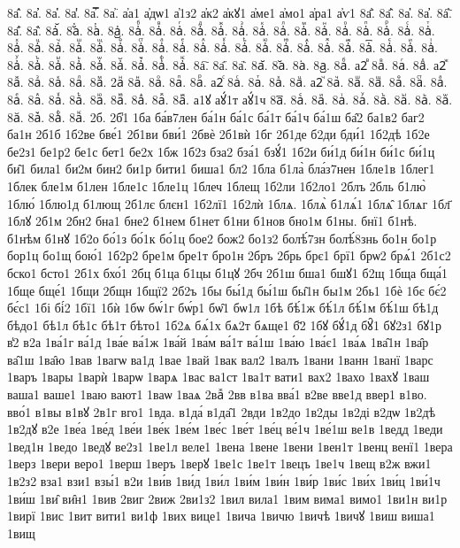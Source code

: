 {8а҆̑.
8а҆̓.
8а҆̔.
8а҆̾.
8а҆̿.
8а҆͘.
а҆а1
а҆дѡ1
а҆1з2
а҆к2
а҆кꙋ1
а҆ме1
а҆мо1
а҆ра1
а҆ѵ1
8а҆҃.
8а҆҄.
8а҆҅.
8а҆҆.
8а҆҇.
8а҆᷀.
8а҆᷁.
8а҆᷶.
8а᷷҆.
8а᷸҆.
8а᷹҆.
8а҆ⷠ.
8а҆ⷡ.
8а҆ⷢ.
8а҆ⷣ.
8а҆ⷤ.
8а҆ⷥ.
8а҆ⷦ.
8а҆ⷧ.
8а҆ⷨ.
8а҆ⷩ.
8а҆ⷪ.
8а҆ⷫ.
8а҆ⷬ.
8а҆ⷭ.
8а҆ⷮ.
8а҆ⷯ.
8а҆ⷰ.
8а҆ⷱ.
8а҆ⷲ.
8а҆ⷳ.
8а҆ⷴ.
8а҆ⷵ.
8а҆ⷶ.
8а҆ⷷ.
8а҆ⷸ.
8а҆ⷹ.
8а҆ⷺ.
8а҆ⷻ.
8а҆ⷼ.
8а҆ⷽ.
8а҆ⷾ.
8а҆ⷿ.
8а҆꙯.
8а҆ꙴ.
8а҆ꙵ.
8а҆ꙶ.
8а҆ꙷ.
8а҆ꙸ.
8а҆ꙹ.
8а҆ꙺ.
8а҆ꙻ.
8а҆꙼.
8а҆꙽.
8а҆ꚞ.
8а҆ꚟ.
8а҇.
8а᷀.
8а᷁.
8а᷶.
8а᷷.
8а᷸.
8а᷹.
8аⷠ.
а2ⷡ
8аⷡ.
8аⷢ.
8аⷣ.
а2ⷤ
8аⷤ.
8аⷥ.
8аⷦ.
8аⷧ.
8аⷨ.
2аⷩ
8аⷩ.
8аⷪ.
8аⷫ.
8аⷬ.
а2ⷭ
8аⷭ.
8аⷮ.
8аⷯ.
8аⷰ.
а2ⷱ
8аⷱ.
8аⷲ.
8аⷳ.
8аⷴ.
8аⷵ.
8аⷶ.
8аⷷ.
8аⷸ.
8аⷹ.
8аⷺ.
8аⷻ.
8аⷼ.
8аⷽ.
8аⷾ.
8аⷿ.
а1ꙋ
аꙋ́1т
аꙋ́1ч
8а꙯.
8аꙴ.
8аꙵ.
8аꙶ.
8аꙷ.
8аꙸ.
8аꙹ.
8аꙺ.
8аꙻ.
8а꙼.
8а꙽.
8аꚞ.
8аꚟ.
2б.
2б̾1
1ба
ба́в7лен
ба́1н
ба́1с
ба́1т
ба́1ч
ба́1ш
ба̑2
ба1в2
баг2
ба1н
2б1б
1б2ве
бве́1
2б1ви
бви́1
2бвѐ
2б1вѝ
1бг
2б1де
б2ди
бди́1
1б2дѣ
1б2е
бе2з1
бе1р2
бе1с
бет1
бе2х
1бж
1б2з
бза2
бза́1
бзꙋ́1
1б2и
би́1д
би́1н
би́1с
би́1ц
би̑1
била1
би2м
бин2
би1р
бити1
биша1
бл2
1бла
б1ла̀
бла́з7нен
1бле1в
1блег1
1блек
бле1м
б1лен
1бле1с
1бле1ц
1блеч
1блещ
1б2ли
1б2ло1
2блъ
2бль
б1лю̀
1блю́
1блю1д
б1лющ
2б1лє
блєн1
1б2лї1
1б2лѝ
1блѧ.
1блѧ̀
б1лѧ́1
1блѧ̑
1блѧг
1бл҃
1блꙋ
2б1м
2бн2
бна1
бне2
б1нем
б1нет
б1ни
б1нов
бно1м
б1ны.
бнї1
б1нѣ.
б1нѣм
б1нꙋ
1б2о
бо́1з
бо́1к
бо́1ц
бое2
бож2
бо1з2
болѣ́7зн
болѣ́8знь
бо1н
бо1р
бор1ц
бо1щ
бою́1
1б2р2
бре1м
бре1т
бро1н
2бръ
2брь
брє1
брї1
брѡ2
брѧ́1
2б1с2
бско1
бсто1
2б1х
бхо́1
2бц
б1ца
б1цы
б1цꙋ
2бч
2б1ш
бша1
бшꙋ1
б2щ
1бща
бща́1
1бще
бще́1
1бщи
2бщн
1бщї2
2б2ъ
1бы
бы́1д
бы́1ш
бы̑1н
бы1м
2бь1
1бѐ
1бє
бє́2
бє́с1
1бі
бі́2
1бї1
1бѝ
1бѡ
бѡ́1г
бѡ́р1
бѡ̑1
бѡ1л
1бѣ
бѣ́1ж
бѣ́1л
бѣ́1м
бѣ́1ш
бѣ1д
бѣдо1
бѣ1л
бѣ1с
бѣ1т
бѣто1
1б2ѧ
бѧ́1х
бѧ2т
бѧще1
б҃2
1бꙋ
бꙋ́1д
бꙋ̑1
бꙋ2з1
бꙋ1р
в̾2
в2а
1ва́1г
ва́1д
1ва́е
ва́1ж
1ва́й
1ва́м
ва́1т
ва́1ш
1ва́ю
1ва́є1
1ва́ѧ
1ва̑1н
1ва̑р
ва̑1ш
1ва̑ю
1вав
1вагѡ
ва1д
1вае
1вай
1вак
вал2
1валъ
1вани
1ванн
1ванї
1варс
1варъ
1вары
1варѝ
1варѡ
1варѧ
1вас
ва1ст
1ва1т
вати1
вах2
1вахо
1вахꙋ
1ваш
ваша1
ваше1
1ваю
вают1
1ваѡ
1ваѧ
2ваⷤ
2вв
в1ва
вва́1
в2ве
вве1д
ввер1
в1во.
вво́1
в1вы
в1вꙋ
2в1г
вго1
1вда.
в1да́
в1да̑1
2вди
1в2до
1в2ды
1в2ді
в2дѡ
1в2дѣ
1в2дꙋ
в2е
1ве́а
1ве́д
1ве́и
1ве́к
1ве́м
1ве́с
1ве́т
1ве́ц
ве́1ч
1ве́1ш
ве1в
1ведд
1веди
1вед1н
1ведо
1ведꙋ
ве2з1
1ве1л
веле1
1вена
1вене
1вени
1вен1т
1венц
венї1
1вера
1верз
1вери
веро1
1верш
1веръ
1верꙋ
1ве1с
1ве1т
1вецъ
1ве1ч
1вещ
в2ж
вжи1
1в2з2
вза1
взи1
взы́1
в2и
1ви́в
1ви́д
1ви́л
1ви́м
1ви́н
1ви́р
1ви́с
1ви́х
1ви́ц
1ви́1ч
1ви́ш
1ви̑
ви̑н1
1вив
2виг
2виж
2ви1з2
1вил
вила1
1вим
вима1
вимо1
1ви1н
ви1р
1вирї
1вис
1вит
вити1
ви1ф
1вих
вице1
1вича
1вичю
1вичѣ
1вичꙋ
1виш
виша1
1вищ
}
